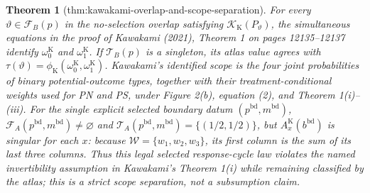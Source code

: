 \documentclass{article}
\newtheorem{theorem}{Theorem}
\begin{document}
\begin{theorem}[thm:kawakami-overlap-and-scope-separation]\label{thm:kawakami-overlap-and-scope-separation}
For every \(\vartheta\in\mathcal F_B(p)\) in the no-selection overlap satisfying \(\mathcal K_{\mathrm K}(P_{\vartheta})\), the simultaneous equations in the proof of Kawakami (2021), Theorem 1 on pages 12135--12137 identify \(\omega_0^{\mathrm K}\) and \(\omega_1^{\mathrm K}\). If \(\mathcal T_B(p)\) is a singleton, its atlas value agrees with \(\tau(\vartheta)=\phi_{\mathrm K}(\omega_0^{\mathrm K},\omega_1^{\mathrm K})\). Kawakami's identified scope is the four joint probabilities of binary potential-outcome types, together with their treatment-conditional weights used for PN and PS, under Figure 2(b), equation (2), and Theorem 1(i)--(iii). For the single explicit selected boundary datum \((p^{\mathrm{bd}},m^{\mathrm{bd}})\), \(\mathcal F_A(p^{\mathrm{bd}},m^{\mathrm{bd}})\ne\varnothing\) and \(\mathcal T_A(p^{\mathrm{bd}},m^{\mathrm{bd}})=\{(1/2,1/2)\}\), but \(A_x^{\mathrm K}(b^{\mathrm{bd}})\) is singular for each \(x\): because \(\mathcal W=\{w_1,w_2,w_3\}\), its first column is the sum of its last three columns. Thus this legal selected response-cycle law violates the named invertibility assumption in Kawakami's Theorem 1(i) while remaining classified by the atlas; this is a strict scope separation, not a subsumption claim.
\end{theorem}
\end{document}
